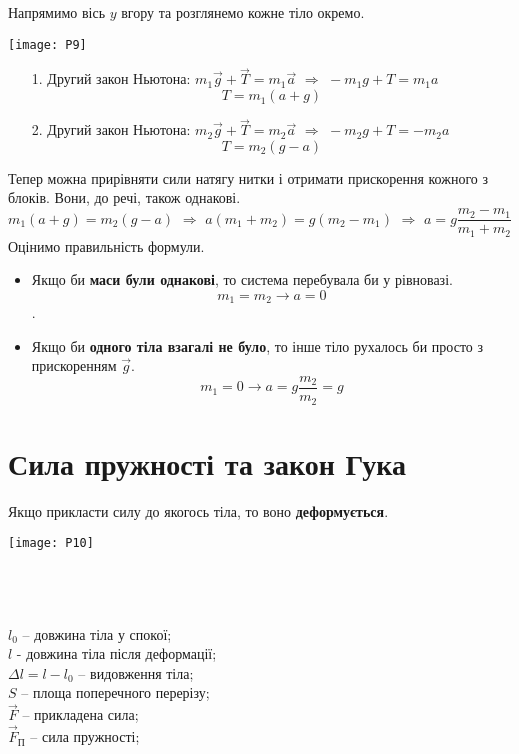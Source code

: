 \documentclass[a4paper,12pt]{article}
\begin{document}
Напрямимо вісь $y$ вгору та розглянемо кожне тіло окремо. 
\begin{center}
\texttt{[image: P9]}
\end{center}
\begin{itemize}
\item[1.] Другий закон Ньютона: $m_1\vec{g} + \vec{T} = m_1\vec{a}\,\,\Rightarrow\,\,-m_1g+T = m_1a$ $$T = m_1(a+g)$$
\item[2.] Другий закон Ньютона: $m_2\vec{g} + \vec{T} = m_2\vec{a}\,\,\Rightarrow\,\,-m_2g+T = -m_2a$ $$T = m_2(g-a)$$
\end{itemize}
Тепер можна прирівняти сили натягу нитки і отримати прискорення кожного з блоків. Вони, до речі, також однакові. $$m_1(a+g) = m_2(g-a)\,\,\Rightarrow\,\,a(m_1+m_2) = g(m_2-m_1)\,\,\Rightarrow\,\,\boxed{a = g\dfrac{m_2-m_1}{m_1+m_2}}$$ Оцінимо правильність формули. \begin{itemize} \item Якщо би \textcolor{EdErablue}{\textbf{маси були однакові}}, то система перебувала би у рівновазі.  $$m_1 = m_2 \rightarrow a= 0$$. \item Якщо би \textcolor{EdErablue}{\textbf{одного тіла взагалі не було}}, то інше тіло рухалось би просто з прискоренням $\vec{g}$. $$m_1 = 0 \rightarrow a = g\dfrac{m_2}{m_2} = g$$\end{itemize}
 
\section{Сила пружності та закон Гука}
Якщо прикласти силу до якогось тіла, то воно \textcolor{EdErablue}{\textbf{деформується}}. \\  

\begin{multicols}{2}
\vspace{-0.4cm}
\begin{center}
\texttt{[image: P10]}
\end{center}
\columnbreak

\begin{flushleft}
\textcolor{white}{.}\\
\textcolor{white}{.}\\
\textcolor{white}{.}\\
$l_0$ – довжина тіла у спокої;\\
$l$ - довжина тіла після деформації;\\
$\Delta l = l-l_0$ – видовження тіла;\\
$S$ – площа поперечного перерізу;\\
$\vec{F}$ –  прикладена сила;\\
$\vec{F}_{\text{П}}$ – сила пружності;
\end{flushleft}
\end{multicols}
\end{document}
